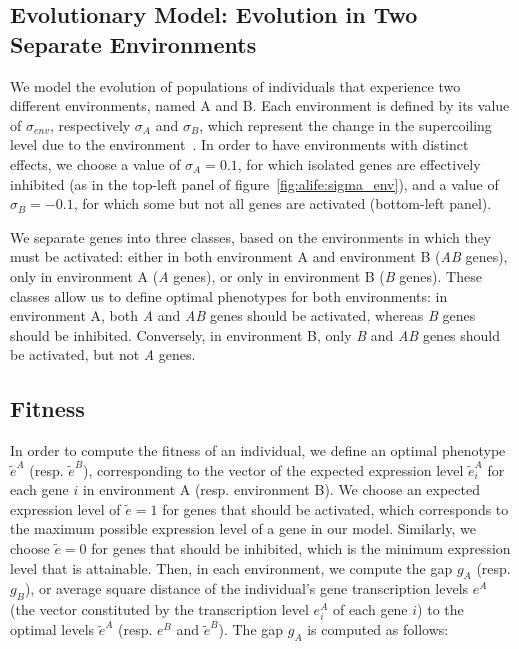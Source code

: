 \subsection{Evolutionary Model: Evolution in Two Separate Environments}

We model the evolution of populations of individuals that experience two different environments, named A and B.
Each environment is defined by its value of $\sigma_{env}$, respectively $\sigma_A$ and $\sigma_B$, which represent the change in the supercoiling level due to the environment~\citep{dorman2016}.
In order to have environments with distinct effects, we choose a value of $\sigma_A = 0.1$, for which isolated genes are effectively inhibited (as in the top-left panel of figure~\ref{fig:alife:sigma_env}), and a value of $\sigma_B = -0.1$, for which some but not all genes are activated (bottom-left panel).

We separate genes into three classes, based on the environments in which they must be activated: either in both environment A and environment B (\emph{AB} genes), only in environment A (\emph{A} genes), or only in environment B (\emph{B} genes).
These classes allow us to define optimal phenotypes for both environments: in environment A, both \emph{A} and \emph{AB} genes should be activated, whereas \emph{B} genes should be inhibited.
Conversely, in environment B, only \emph{B} and \emph{AB} genes should be activated, but not \emph{A} genes.


\subsection{Fitness}

In order to compute the fitness of an individual, we define an optimal phenotype $\tilde{e}^A$ (resp. $\tilde{e}^B$), corresponding to the vector of the expected expression level $\tilde{e}^A_i$ for each gene $i$ in environment A (resp. environment B).
We choose an expected expression level of $\tilde{e} = 1$ for genes that should be activated, which corresponds to the maximum possible expression level of a gene in our model.
Similarly, we choose $\tilde{e} = 0$ for genes that should be inhibited, which is the minimum expression level that is attainable.
Then, in each environment, we compute the gap $g_A$ (resp. $g_B$), or average square distance of the individual's gene transcription levels $e^A$ (the vector constituted by the transcription level $e^A_i$ of each gene $i$) to the optimal levels $\tilde{e}^A$ (resp. $e^B$ and $\tilde{e}^B$).
The gap $g_A$ is computed as follows:

